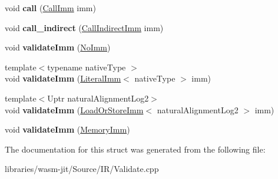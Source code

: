 \begin{DoxyCompactItemize}
void {\bfseries call} (\mbox{\hyperlink{struct_i_r_1_1_call_imm}{Call\+Imm}} imm)
\item 
\mbox{\label{struct_i_r_1_1_function_validation_context_ab09919891a9a0d7fb41212345cbb0d07}} 
void {\bfseries call\+\_\+indirect} (\mbox{\hyperlink{struct_i_r_1_1_call_indirect_imm}{Call\+Indirect\+Imm}} imm)
\item 
\mbox{\label{struct_i_r_1_1_function_validation_context_ab0042a9d7dd66a7775fdb8e4721364d7}} 
void {\bfseries validate\+Imm} (\mbox{\hyperlink{struct_i_r_1_1_no_imm}{No\+Imm}})
\item 
\mbox{\label{struct_i_r_1_1_function_validation_context_af5f7a3ccec6e41049cda5f3ad7fe996e}} 
{\footnotesize template$<$typename native\+Type $>$ }\\void {\bfseries validate\+Imm} (\mbox{\hyperlink{struct_i_r_1_1_literal_imm}{Literal\+Imm}}$<$ native\+Type $>$ imm)
\item 
\mbox{\label{struct_i_r_1_1_function_validation_context_aa3229cd643af2c20110ca7f3c2368430}} 
{\footnotesize template$<$Uptr natural\+Alignment\+Log2$>$ }\\void {\bfseries validate\+Imm} (\mbox{\hyperlink{struct_i_r_1_1_load_or_store_imm}{Load\+Or\+Store\+Imm}}$<$ natural\+Alignment\+Log2 $>$ imm)
\item 
\mbox{\label{struct_i_r_1_1_function_validation_context_adad89a645840cd841adfdd67aaa42584}} 
void {\bfseries validate\+Imm} (\mbox{\hyperlink{struct_i_r_1_1_memory_imm}{Memory\+Imm}})
\end{DoxyCompactItemize}


The documentation for this struct was generated from the following file\+:\begin{DoxyCompactItemize}
\item 
libraries/wasm-\/jit/\+Source/\+I\+R/Validate.\+cpp\end{DoxyCompactItemize}
